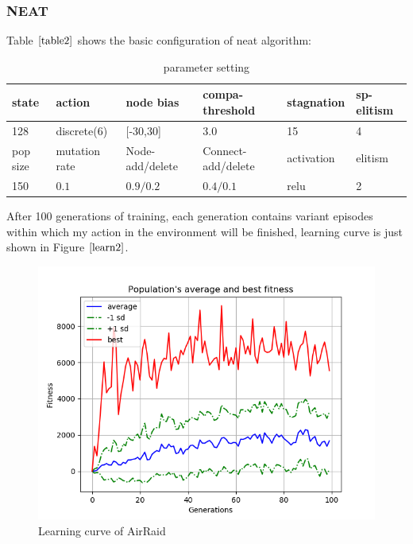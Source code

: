 \documentclass{article}
\begin{document}
\subsubsection{NEAT}
Table $\ref{table2}$ shows the basic configuration of
neat algorithm:
\begin{table}[htbp]
  \centering
  \caption{parameter setting}
  \label{table2}
  \centering
  \begin{tabular}{llllll}
    \toprule
    \cmidrule(r){1-6}
    state & action &   node bias  &  compa-threshold   & stagnation     &  sp-elitism   \\
    \midrule
   128  & discrete(6) & [-30,30]  & 3.0 & 15 &  4    \\
   \cmidrule(r){1-6}
   pop size & mutation rate & Node-add/delete    & Connect-add/delete    & activation & elitism  \\
    \midrule
   150 & $0.1$ &  $0.9/0.2$  & $0.4/0.1$ & relu &  2    \\
        \bottomrule
  \end{tabular}
\end{table}

After 100 generations of training, each generation contains variant episodes within which my action in the environment will be finished,
learning curve is just shown in Figure $\ref{learn2}$.

\begin{figure}[htbp]
  \centering
  \includegraphics[width = .7\textwidth]{first100}
  \caption{Learning curve of AirRaid}
  \label{learn2}
 \end{figure}
\end{document}
